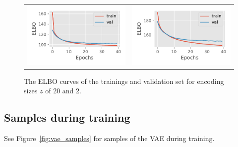\documentclass{article}
\begin{document}
\begin{figure}
  \centering
  \begin{tabularx}{\linewidth}{XX}
    \includegraphics[width=\linewidth]{assignment_3/code/figures/vae_20.pdf} &
    \includegraphics[width=\linewidth]{assignment_3/code/figures/vae_2.pdf}
  \end{tabularx}
  \caption{The ELBO curves of the trainings and validation set for encoding sizes \(z\) of  20 and  2.}
  \label{fig:elbo}
\end{figure}

\subsection{Samples during training}
See Figure~\ref{fig:vae_samples} for samples of the VAE during training.
\end{document}
